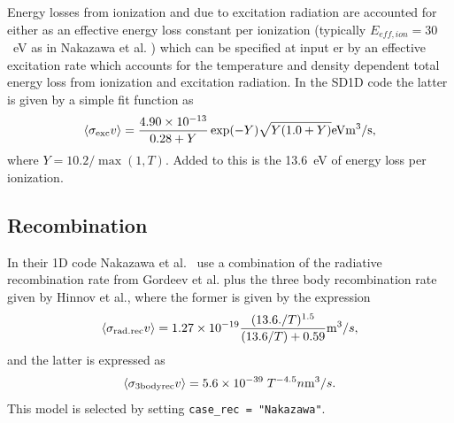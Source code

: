 \documentclass[amsmath,amssymb,a4]{revtex4-2}
\begin{document}
Energy losses from ionization and due to excitation radiation are accounted for either as an effective energy loss constant per ionization (typically $E_{eff,ion} = 30$~eV as in Nakazawa et al. \cite{nakazawa2000}) which can be specified at input er by an effective excitation rate which accounts for the temperature and density dependent total energy loss from ionization and excitation radiation. In the SD1D code the latter is given by a simple fit function as
\begin{equation}\label{excitation_SD1D}
    \langle\sigma_{\rm exc} v\rangle = {4.90 \times 10^{-13} \over 0.28 + Y} \exp(-Y) \sqrt{Y (1.0 + Y)} {\rm eV} {\rm m}^3/{\rm s},
\end{equation}
where $Y = 10.2 / \max( 1, T)$. Added to this is the 13.6~eV of energy loss per ionization.



\subsection{Recombination}

In their 1D code Nakazawa et al.~\cite{nakazawa2000} use a combination of the radiative recombination rate from Gordeev et al. plus the three body recombination rate given by Hinnov et al., where the former is given by the expression~\cite{gordeev1977}
\begin{equation}\label{radiative_recombination}
    \langle\sigma_{\rm rad.rec} v\rangle = 1.27 \times 10^{-19} {(13.6./T)^{1.5} \over (13.6/T) + 0.59} {\rm m}^3 / s,
\end{equation}
and the latter is expressed as~\cite{hinnov1962}
\begin{equation}\label{three_body_recombination}
    \langle\sigma_{\rm 3bodyrec} v\rangle = 5.6 \times 10^{-39} \; T^{-4.5} n {\rm m}^3 / s.
\end{equation}
This model is selected by setting {\tt case\_rec = "Nakazawa"}.
\end{document}
